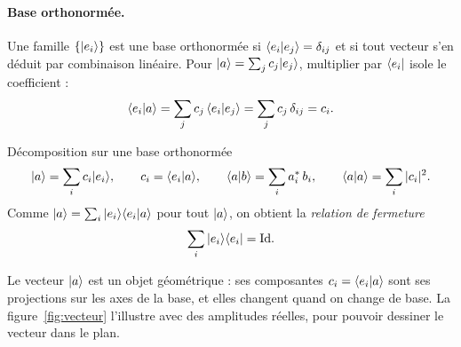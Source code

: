 \paragraph{Base orthonormée.} Une famille $\{|e_i\rangle\}$ est une base orthonormée si
$\langle e_i|e_j\rangle=\delta_{ij}$ et si tout vecteur s'en déduit par combinaison linéaire. Pour
$|a\rangle=\sum_j c_j|e_j\rangle$, multiplier par $\langle e_i|$ isole le coefficient :
\[
  \langle e_i|a\rangle=\sum_j c_j\,\langle e_i|e_j\rangle=\sum_j c_j\,\delta_{ij}=c_i .
\]

\begin{resultat}{Décomposition sur une base orthonormée}
\[
  |a\rangle=\sum_i c_i|e_i\rangle,\qquad c_i=\langle e_i|a\rangle,\qquad
  \langle a|b\rangle=\sum_i a_i^*\,b_i,\qquad \langle a|a\rangle=\sum_i|c_i|^2 .
\]
Comme $|a\rangle=\sum_i|e_i\rangle\langle e_i|a\rangle$ pour tout $|a\rangle$, on obtient la
\emph{relation de fermeture}
\[
  \sum_i|e_i\rangle\langle e_i|=\mathrm{Id}.
\]
\end{resultat}

Le vecteur $|a\rangle$ est un objet géométrique : ses composantes $c_i=\langle e_i|a\rangle$ sont ses
projections sur les axes de la base, et elles changent quand on change de base. La
figure~\ref{fig:vecteur} l'illustre avec des amplitudes réelles, pour pouvoir dessiner le vecteur
dans le plan.

